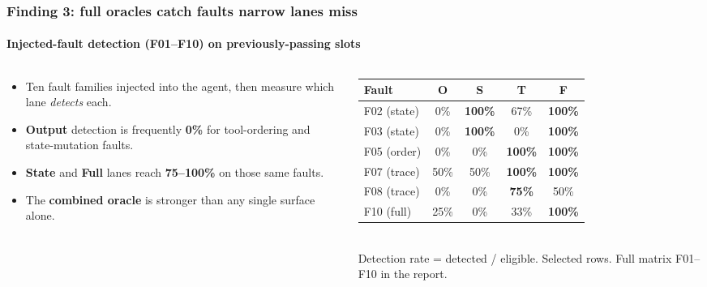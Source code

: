 \documentclass[
	aspectratio=169, %
	t,               %
	onlytextwidth,
	10pt,
]{beamer}
\begin{document}
\begin{frame}
	\frametitle{Finding 3: full oracles catch faults narrow lanes miss}
	\framesubtitle{Injected-fault detection (F01--F10) on previously-passing slots}
	\begin{columns}[T]
		\begin{column}{0.5\linewidth}
			\begin{itemize}
				\setlength\itemsep{0.6em}
				\item Ten fault families injected into the agent, then measure which lane \emph{detects} each.
				\item \textbf{Output} detection is frequently \textbf{0\%} for tool-ordering and
				state-mutation faults.
				\item \textbf{State} and \textbf{Full} lanes reach \textbf{75--100\%} on those same faults.
				\item The \textbf{combined oracle} is stronger than any single surface alone.
			\end{itemize}
		\end{column}
		\begin{column}{0.5\linewidth}
			\centering
			\scriptsize
			\renewcommand{\arraystretch}{1.15}
			\begin{tabular}{lcccc}
			\toprule
			\textbf{Fault} & \textbf{O} & \textbf{S} & \textbf{T} & \textbf{F} \\
			\midrule
			F02 (state)  & 0\%  & \textbf{100\%} & 67\%  & \textbf{100\%} \\
			F03 (state)  & 0\%  & \textbf{100\%} & 0\%   & \textbf{100\%} \\
			F05 (order)  & 0\%  & 0\%   & \textbf{100\%} & \textbf{100\%} \\
			F07 (trace)  & 50\% & 50\%  & \textbf{100\%} & \textbf{100\%} \\
			F08 (trace)  & 0\%  & 0\%   & \textbf{75\%}  & 50\%  \\
			F10 (full)   & 25\% & 0\%   & 33\%  & \textbf{100\%} \\
			\bottomrule
			\end{tabular}\\[4pt]
			{\tiny\textcolor{ICLBlue}{Detection rate = detected / eligible. Selected rows. Full matrix F01--F10 in the report.}}
		\end{column}
	\end{columns}
\end{frame}
\end{document}
